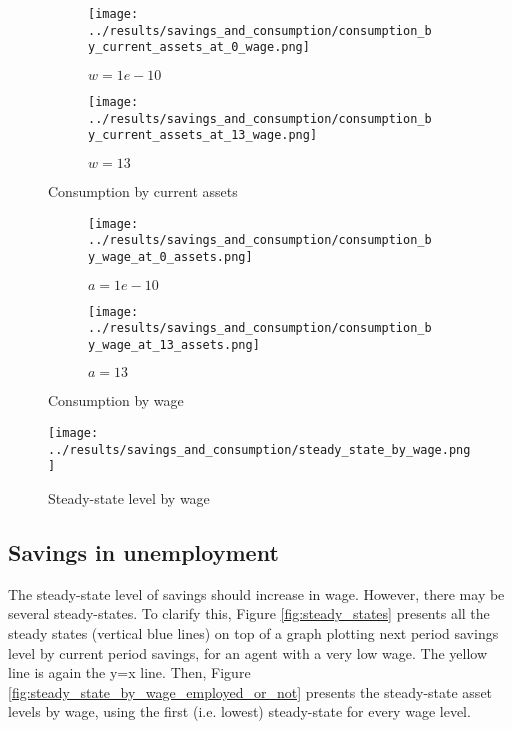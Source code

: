 \documentclass[12pt]{article}
\begin{document}
\begin{figure}[hbt!]

\begin{subfigure}{0.5\textwidth}
\texttt{[image: ../results/savings\_and\_consumption/consumption\_by\_current\_assets\_at\_0\_wage.png]} \caption{$w=1e-10$}
\end{subfigure}%
\begin{subfigure}{0.5\textwidth}
\texttt{[image: ../results/savings\_and\_consumption/consumption\_by\_current\_assets\_at\_13\_wage.png]}
\caption{$w=13$}
\end{subfigure}

\caption{Consumption by current assets}
\label{fig:consumption_by_current_assets}
\end{figure}


\begin{figure}[hbt!]

\begin{subfigure}{0.5\textwidth}
\texttt{[image: ../results/savings\_and\_consumption/consumption\_by\_wage\_at\_0\_assets.png]} \caption{$a=1e-10$}
\end{subfigure}%
\begin{subfigure}{0.5\textwidth}
\texttt{[image: ../results/savings\_and\_consumption/consumption\_by\_wage\_at\_13\_assets.png]}
\caption{$a=13$}
\end{subfigure}

\caption{Consumption by wage}
\label{fig:consumption_by_wage}
\end{figure}


\begin{figure}[hbt!]
\centering
\texttt{[image: ../results/savings\_and\_consumption/steady\_state\_by\_wage.png]}
\caption{Steady-state level by wage}
\label{fig:ss_by_wage}
\end{figure}


\clearpage

\subsection{Savings in unemployment}

The steady-state level of savings should increase in wage. However, there may be several steady-states. To clarify this, Figure \ref{fig:steady_states} presents all the steady states (vertical blue lines) on top of a graph plotting next period savings level by current period savings, for an agent with a very low wage. The yellow line is again the y=x line. Then, Figure \ref{fig:steady_state_by_wage_employed_or_not} presents the steady-state asset levels by wage, using the first (i.e. lowest) steady-state for every wage level.
\end{document}

